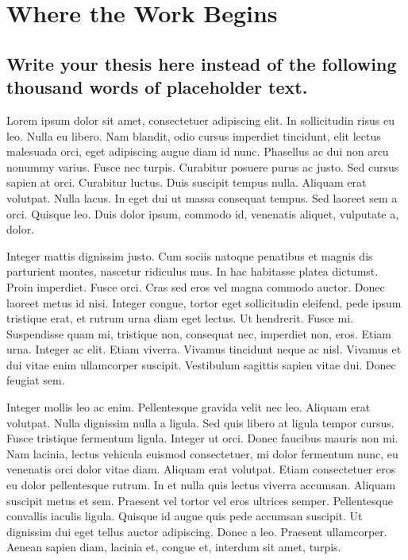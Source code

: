 \documentclass{icldt}
\begin{document}
\makededication

\tableofcontents
\listoftables
\listoffigures

\chapter{Where the Work Begins}
\section{Write your thesis here instead of the following thousand
words of placeholder text.}

Lorem ipsum dolor sit amet, consectetuer adipiscing elit. In sollicitudin risus
eu leo. Nulla eu libero. Nam blandit, odio cursus imperdiet tincidunt, elit
lectus malesuada orci, eget adipiscing augue diam id nunc. Phasellus ac dui non
arcu nonummy varius. Fusce nec turpis. Curabitur posuere purus ac justo. Sed
cursus sapien at orci. Curabitur luctus. Duis suscipit tempus nulla. Aliquam
erat volutpat. Nulla lacus. In eget dui ut massa consequat tempus. Sed laoreet
sem a orci. Quisque leo. Duis dolor ipsum, commodo id, venenatis aliquet,
vulputate a, dolor.

Integer mattis dignissim justo. Cum sociis natoque penatibus et magnis dis
parturient montes, nascetur ridiculus mus. In hac habitasse platea dictumst.
Proin imperdiet. Fusce orci. Cras sed eros vel magna commodo auctor. Donec
laoreet metus id nisi. Integer congue, tortor eget sollicitudin eleifend, pede
ipsum tristique erat, et rutrum urna diam eget lectus. Ut hendrerit. Fusce mi.
Suspendisse quam mi, tristique non, consequat nec, imperdiet non, eros. Etiam
urna. Integer ac elit. Etiam viverra. Vivamus tincidunt neque ac nisl. Vivamus
et dui vitae enim ullamcorper suscipit. Vestibulum sagittis sapien vitae dui.
Donec feugiat sem.

Integer mollis leo ac enim. Pellentesque gravida velit nec leo. Aliquam erat
volutpat. Nulla dignissim nulla a ligula. Sed quis libero at ligula tempor
cursus. Fusce tristique fermentum ligula. Integer ut orci. Donec faucibus mauris
non mi. Nam lacinia, lectus vehicula euismod consectetuer, mi dolor fermentum
nunc, eu venenatis orci dolor vitae diam. Aliquam erat volutpat. Etiam
consectetuer eros eu dolor pellentesque rutrum. In et nulla quis lectus viverra
accumsan. Aliquam suscipit metus et sem. Praesent vel tortor vel eros ultrices
semper. Pellentesque convallis iaculis ligula. Quisque id augue quis pede
accumsan suscipit. Ut dignissim dui eget tellus auctor adipiscing. Donec a leo.
Praesent ullamcorper. Aenean sapien diam, lacinia et, congue et, interdum sit
amet, turpis.
\end{document}

